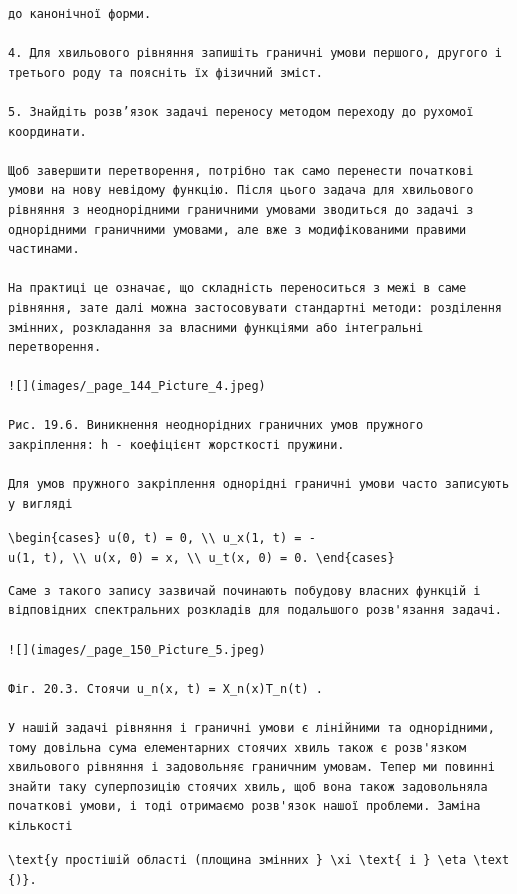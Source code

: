 \documentclass[
  ukrainian,
]{article}
\begin{document}
\begin{verbatim}
до канонічної форми.

4. Для хвильового рівняння запишіть граничні умови першого, другого і третього роду та поясніть їх фізичний зміст.

5. Знайдіть розв’язок задачі переносу методом переходу до рухомої координати.

Щоб завершити перетворення, потрібно так само перенести початкові умови на нову невідому функцію. Після цього задача для хвильового рівняння з неоднорідними граничними умовами зводиться до задачі з однорідними граничними умовами, але вже з модифікованими правими частинами.

На практиці це означає, що складність переноситься з межі в саме рівняння, зате далі можна застосовувати стандартні методи: розділення змінних, розкладання за власними функціями або інтегральні перетворення.

![](images/_page_144_Picture_4.jpeg)

Рис. 19.6. Виникнення неоднорідних граничних умов пружного закріплення: h - коефіцієнт жорсткості пружини.

Для умов пружного закріплення однорідні граничні умови часто записують у вигляді
\end{verbatim}

\texttt{\textbackslash{}begin\{cases\}\ u(0,\ t)\ =\ 0,\ \textbackslash{}\textbackslash{}\ u\_x(1,\ t)\ =\ -u(1,\ t),\ \textbackslash{}\textbackslash{}\ u(x,\ 0)\ =\ x,\ \textbackslash{}\textbackslash{}\ u\_t(x,\ 0)\ =\ 0.\ \textbackslash{}end\{cases\}}

\begin{verbatim}
Саме з такого запису зазвичай починають побудову власних функцій і відповідних спектральних розкладів для подальшого розв'язання задачі.

![](images/_page_150_Picture_5.jpeg)

Фіг. 20.3. Стоячи u_n(x, t) = X_n(x)T_n(t) .

У нашій задачі рівняння і граничні умови є лінійними та однорідними, тому довільна сума елементарних стоячих хвиль також є розв'язком хвильового рівняння і задовольняє граничним умовам. Тепер ми повинні знайти таку суперпозицію стоячих хвиль, щоб вона також задовольняла початкові умови, і тоді отримаємо розв'язок нашої проблеми. Заміна кількості
\end{verbatim}

\texttt{\textbackslash{}text\{у\ простішій\ області\ (площина\ змінних\ \}\ \textbackslash{}xi\ \textbackslash{}text\{\ і\ \}\ \textbackslash{}eta\ \textbackslash{}text\{)\}.}
\end{document}
